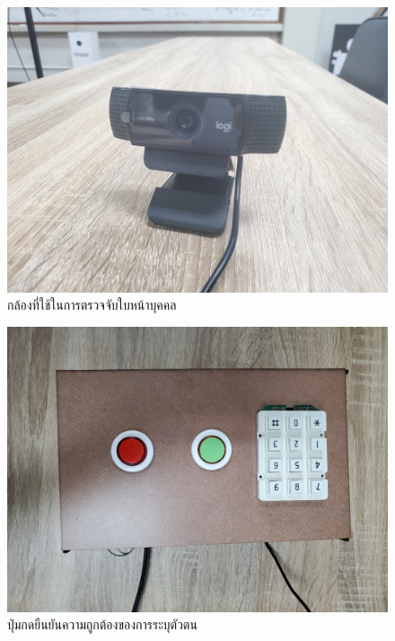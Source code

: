 \begin{figure}[!ht]
  \begin{center}
    \includegraphics[scale=.15]{pic/camera.jpg}
    \caption[กล้องที่ใช้ในการตรวจจับใบหน้าบุคคล]{กล้องที่ใช้ในการตรวจจับใบหน้าบุคคล}
    \label{fig:camera_logi}
  \end{center}
\end{figure}



\begin{figure}[!ht]
  \begin{center}
    \includegraphics[scale=.17]{pic/rpi_top.jpg}
    \caption[ปุ่มกดยืนยันความถูกต้องของการระบุตัวตน]{ปุ่มกดยืนยันความถูกต้องของการระบุตัวตน}
    \label{fig:button_module}
  \end{center}
\end{figure}

